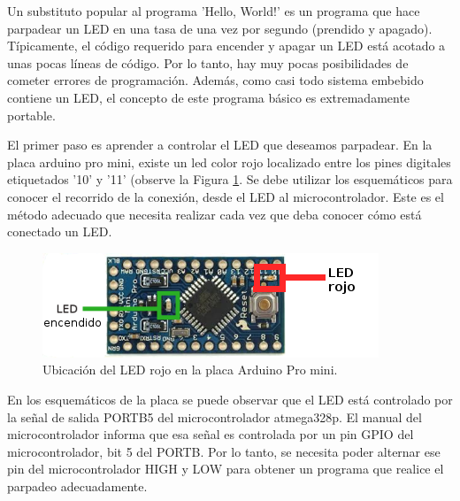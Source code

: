 \documentclass[12pt]{article}
\begin{document}
Un substituto popular al programa 'Hello, World!' es un programa que
hace parpadear un LED en una tasa de una vez por segundo (prendido y apagado).
Típicamente, el código requerido para encender y apagar un LED está
acotado a unas pocas líneas de código. Por lo tanto, hay muy pocas posibilidades
de cometer errores de programación. Además, como casi todo sistema
embebido contiene un LED, el concepto de este programa básico es extremadamente
portable.


El primer paso es aprender a controlar el LED que deseamos parpadear.
En la placa arduino pro mini, existe un led color rojo localizado entre los
pines digitales etiquetados '10' y '11' 
(observe la Figura \ref{fig:ledrojo}. Se debe utilizar los esquemáticos
para conocer el recorrido de la conexión, desde el LED al microcontrolador.
Este es el método adecuado que necesita realizar cada vez que deba
conocer cómo está conectado un LED.

\begin{figure}
\includegraphics{led.png}
\caption{Ubicación del LED rojo en la placa Arduino Pro mini.}
\label{fig:ledrojo}
\end{figure}


En los esquemáticos de la placa se puede observar que el LED está controlado por la señal de salida PORTB5 del microcontrolador atmega328p.
El manual del microcontrolador informa que esa señal es controlada por
un pin GPIO del microcontrolador, bit 5 del PORTB. Por lo tanto,
se necesita poder alternar ese pin del microcontrolador HIGH y LOW
para obtener un programa que realice el parpadeo adecuadamente.
\end{document}
